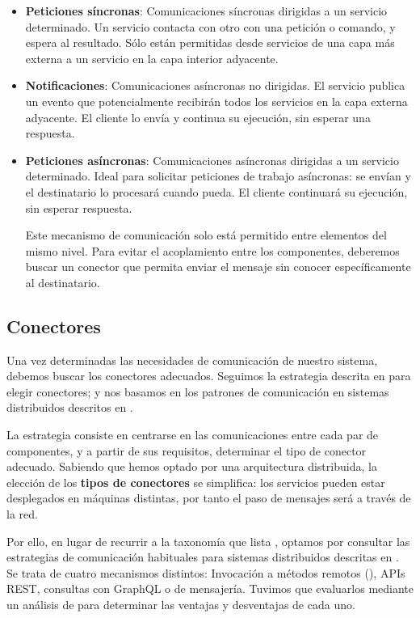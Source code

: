 \begin{itemize}
  \item \textbf{Peticiones síncronas}: Comunicaciones síncronas dirigidas a un servicio determinado. Un servicio contacta con otro con una petición o comando, y espera al resultado. Sólo están permitidas desde servicios de una capa más externa a un servicio en la capa interior adyacente.

  \item \textbf{Notificaciones}: Comunicaciones asíncronas no dirigidas. El servicio publica un evento que potencialmente recibirán todos los servicios en la capa externa adyacente. El cliente lo envía y continua su ejecución, sin esperar una respuesta.

  \item \textbf{Peticiones asíncronas}: Comunicaciones asíncronas dirigidas a un servicio determinado. Ideal para solicitar peticiones de trabajo asíncronas: se envían y el destinatario lo procesará cuando pueda. El cliente continuará su ejecución, sin esperar respuesta.

  Este mecanismo de comunicación solo está permitido entre elementos del mismo nivel. Para evitar el acoplamiento entre los componentes, deberemos buscar un conector que permita enviar el mensaje sin conocer específicamente al destinatario.

\end{itemize}

\subsection{Conectores}

Una vez determinadas las necesidades de comunicación de nuestro sistema, debemos buscar los conectores adecuados. Seguimos la estrategia descrita en \cite{taylorSoftwareArchitectureFoundations2009} para elegir conectores; y nos basamos en los patrones de comunicación en sistemas distribuidos descritos en \cite{newmanBuildingMicroservicesDesigning2021}.

La estrategia consiste en centrarse en las comunicaciones entre cada par de componentes, y a partir de sus requisitos, determinar el tipo de conector adecuado. Sabiendo que hemos optado por una arquitectura distribuida, la elección de los \textbf{tipos de conectores} se simplifica: los servicios pueden estar desplegados en máquinas distintas, por tanto el paso de mensajes será a través de la red.

Por ello, en lugar de recurrir a la taxonomía que lista \cite{mehtaTaxonomySoftwareConnectors2000}, optamos por consultar las estrategias de comunicación habituales para sistemas distribuidos descritas en \cite{newmanBuildingMicroservicesDesigning2021}. Se trata de cuatro mecanismos distintos: Invocación a métodos remotos (), APIs REST, consultas con GraphQL o  de mensajería. Tuvimos que evaluarlos mediante un análisis de  para determinar las ventajas y desventajas de cada uno.

